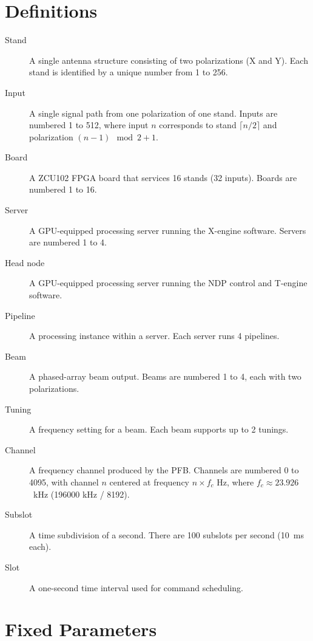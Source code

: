 \section{Definitions}

\begin{description}
    \item[Stand] A single antenna structure consisting of two polarizations (X and Y). Each stand is identified by a unique number from 1 to 256.

    \item[Input] A single signal path from one polarization of one stand. Inputs are numbered 1 to 512, where input $n$ corresponds to stand $\lceil n/2 \rceil$ and polarization $(n-1) \mod 2 + 1$.

    \item[Board] A ZCU102 FPGA board that services 16 stands (32 inputs). Boards are numbered 1 to 16.

    \item[Server] A GPU-equipped processing server running the X-engine software. Servers are numbered 1 to 4.

    \item[Head node] A GPU-equipped processing server running the NDP control and T-engine software.

    \item[Pipeline] A processing instance within a server. Each server runs 4 pipelines.

    \item[Beam] A phased-array beam output. Beams are numbered 1 to 4, each with two polarizations.

    \item[Tuning] A frequency setting for a beam. Each beam supports up to 2 tunings.

    \item[Channel] A frequency channel produced by the PFB. Channels are numbered 0 to 4095, with channel $n$ centered at frequency $n \times f_c$ Hz, where $f_c \approx 23.926$~kHz (196000 kHz / 8192).

    \item[Subslot] A time subdivision of a second. There are 100 subslots per second (10~ms each).

    \item[Slot] A one-second time interval used for command scheduling.

\end{description}

\section{Fixed Parameters}


